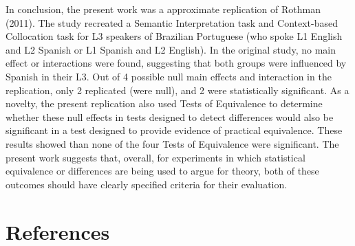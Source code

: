 \documentclass[
  man,floatsintext]{apa6}
\begin{document}
In conclusion, the present work was a approximate replication of Rothman (2011). The study recreated a Semantic Interpretation task and Context-based Collocation task for L3 speakers of Brazilian Portuguese (who spoke L1 English and L2 Spanish or L1 Spanish and L2 English).
In the original study, no main effect or interactions were found, suggesting that both groups were influenced by Spanish in their L3. Out of 4 possible null main effects and interaction in the replication, only 2 replicated (were null), and 2 were statistically significant. As a novelty, the present replication also used Tests of Equivalence to determine whether these null effects in tests designed to detect differences would also be significant in a test designed to provide evidence of practical equivalence. These results showed than none of the four Tests of Equivalence were significant.
The present work suggests that, overall, for experiments in which statistical equivalence or differences are being used to argue for theory, both of these outcomes should have clearly specified criteria for their evaluation.

\newpage

\hypertarget{references}{%
\section{References}\label{references}}

\begingroup
\setlength{\parindent}{-0.5in}
\setlength{\leftskip}{0.5in}
\end{document}
